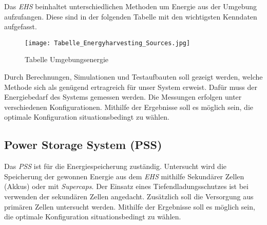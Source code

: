 Das \textit{EHS} beinhaltet unterschiedlichen Methoden um Energie aus der Umgebung aufzufangen. Diese sind in der folgenden Tabelle mit den wichtigsten Kenndaten aufgefasst. 

\begin{figure}[h]
	\centering
	\texttt{[image: Tabelle\_Energyharvesting\_Sources.jpg]}
	\caption{Tabelle Umgebungsenergie \cite{tran_rf_2017}}
	\label{img:Tabelle_Energyharvesting_Sources}
\end{figure} 

Durch Berechnungen, Simulationen und Testaufbauten soll gezeigt werden, welche Methode sich als genügend ertragreich für unser System erweist. Dafür muss der Energiebedarf des Systems gemessen werden. Die Messungen erfolgen unter verschiedenen Konfigurationen. Mithilfe der Ergebnisse soll es möglich sein, die optimale Konfiguration situationsbedingt zu wählen.



\subsection{Power Storage System (PSS)}\label{subsec:PSS}

Das \textit{PSS} ist für die Energiespeicherung zuständig. Untersucht wird die Speicherung der gewonnen Energie aus dem \textit{EHS} mithilfe Sekundärer Zellen (Akkus) oder mit \textit{Supercaps}. Der Einsatz eines Tiefendladungsschutzes ist bei verwenden der sekundären Zellen angedacht. Zusätzlich soll die Versorgung aus primären Zellen untersucht werden. Mithilfe der Ergebnisse soll es möglich sein, die optimale Konfiguration situationsbedingt zu wählen.   
 
